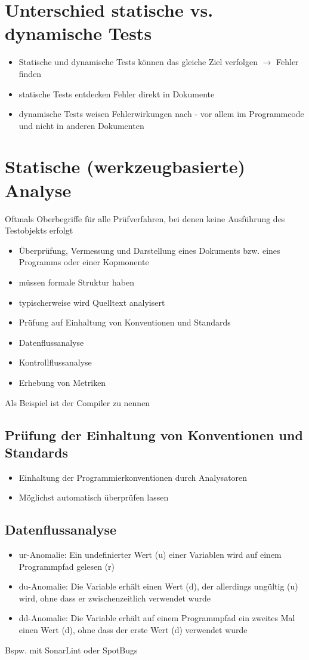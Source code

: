 \documentclass{report}
\theoremstyle{definition}
\theoremstyle{example}
\begin{document}
\section{Unterschied statische vs. dynamische Tests}
\begin{itemize}
   \item Statische und dynamische Tests können das gleiche Ziel verfolgen $\rightarrow$ Fehler finden
   \item statische Tests entdecken Fehler direkt in Dokumente
   \item dynamische Tests weisen Fehlerwirkungen nach - vor allem im Programmcode und nicht in anderen Dokumenten
\end{itemize}

\section{Statische (werkzeugbasierte) Analyse}
Oftmals Oberbegriffe für alle Prüfverfahren, bei denen keine Ausführung des Testobjekts erfolgt
\begin{itemize}
   \item Überprüfung, Vermessung und Darstellung eines Dokuments bzw. eines Programms oder einer Kopmonente
   \item müssen formale Struktur haben
   \item typischerweise wird Quelltext analyisert
   \item Prüfung auf Einhaltung von Konventionen und Standards
   \item Datenflussanalyse
   \item Kontrollflussanalyse
   \item Erhebung von Metriken
\end{itemize}
Als Beispiel ist der Compiler zu nennen

\subsection{Prüfung der Einhaltung von Konventionen und Standards}
\begin{itemize}
   \item Einhaltung der Programmierkonventionen durch Analysatoren
   \item Möglichst automatisch überprüfen lassen
\end{itemize}

\subsection{Datenflussanalyse}
\begin{itemize}
   \item ur-Anomalie: Ein undefinierter Wert (u) einer Variablen wird auf einem Programmpfad gelesen (r)
   \item du-Anomalie: Die Variable erhält einen Wert (d), der allerdings ungültig (u) wird, ohne dass er zwischenzeitlich verwendet wurde
   \item dd-Anomalie: Die Variable erhält auf einem Programmpfad ein zweites Mal einen Wert (d), ohne dass der erste Wert (d) verwendet wurde
\end{itemize}
Bspw. mit SonarLint oder SpotBugs
\end{document}
